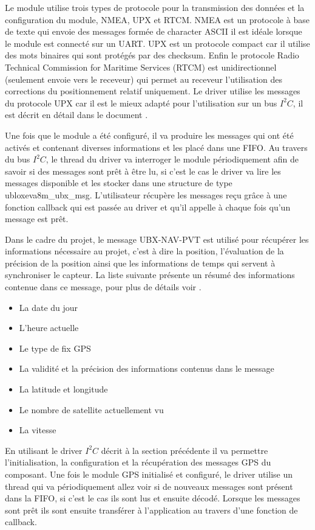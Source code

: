 Le module utilise trois types de protocole pour la transmission des données et la configuration du module, NMEA, UPX et RTCM. NMEA est un protocole à base de texte qui envoie des messages formée de character ASCII il est idéale lorsque le module est connecté sur un UART. UPX est un protocole compact car il utilise des mots binaires qui sont protégés par des checksum. Enfin le protocole Radio Technical Commission for Maritime Services (RTCM) est unidirectionnel (seulement envoie vers le receveur) qui permet au receveur l'utilisation des corrections du positionnement relatif uniquement.
Le driver utilise les messages du protocole UPX car il est le mieux adapté pour l'utilisation sur un bus $I^{2}C$, il est décrit en détail dans le document \cite{ublox-protocol}.

Une fois que le module a été configuré, il va produire les messages qui ont été activés et contenant diverses informations et les placé dans une FIFO. Au travers du bus $I^{2}C$, le thread du driver va interroger le module périodiquement afin de savoir si des messages sont prêt à être lu, si c'est le cas le driver va lire les messages disponible et les stocker dans une structure de type ubloxeva8m\_ubx\_msg. L'utilisateur récupère les messages reçu grâce à une fonction callback qui est passée au driver et qu'il appelle à chaque fois qu'un message est prêt.

Dans le cadre du projet, le message UBX-NAV-PVT est utilisé pour récupérer les informations nécessaire au projet, c'est à dire la position, l'évaluation de la précision de la position ainsi que les informations de temps qui servent à synchroniser le capteur. La liste suivante présente un résumé des informations contenue dans ce message, pour plus de détails voir \cite[p.~307]{ublox-protocol}.

\begin{itemize}
 \item La date du jour
 \item L'heure actuelle 
 \item Le type de fix GPS
 \item La validité et la précision des informations contenus dans le message
 \item La latitude et longitude
 \item Le nombre de satellite actuellement vu
 \item La vitesse
 \end{itemize} 

En utilisant le driver $I^{2}C$ décrit à la section précédente il va permettre l'initialisation, la configuration et la récupération des messages GPS du composant. Une fois le module GPS initialisé et configuré, le driver utilise un thread qui va périodiquement allez voir si de nouveaux messages sont présent dans la FIFO, si c'est le cas ils sont lus et ensuite décodé. Lorsque les messages sont prêt ils sont ensuite transférer à l'application au travers d'une fonction de callback.

